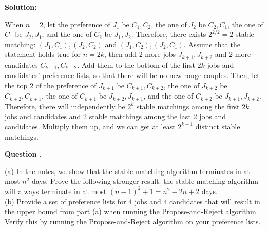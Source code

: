\documentclass[12pt]{article}
\newcounter{questionnumber}
\newenvironment{question}[1][]{\stepcounter{questionnumber}\par\noindent\textbf{Question \thequestionnumber. #1}\par}{\par}
\newenvironment{solution}{\par\noindent\textbf{Solution:}\par}{\par\vspace{1em}}
\begin{document}
\begin{solution}
    When $n=2$, let the preference of $J_1$ be $C_1, C_2$, the one of $J_2$ be $C_2, C_1$, the one of $C_1$ be $J_2, J_1$, and the one of $C_2$ be $J_1, J_2$.
    Therefore, there exists $2^{2/2}=2$ stable matching: $(J_1, C_1), (J_2, C_2)$ and $(J_1, C_2), (J_2, C_1)$.
    Assume that the statement holds true for $n=2k$, then add 2 more jobs $J_{k+1}, J_{k+2}$ and 2 more candidates $C_{k+1}, C_{k+2}$.
    Add them to the bottom of the first $2k$ jobs and candidates' preference lists, so that there will be no new rouge couples.
    Then, let the top 2 of the preference of $J_{k+1}$ be $C_{k+1}, C_{k+2}$, the one of $J_{k+2}$ be $C_{k+2}, C_{k+1}$, the one of $C_{k+1}$ be $J_{k+2}, J_{k+1}$, and the one of $C_{k+2}$ be $J_{k+1}, J_{k+2}$.
    Therefore, there will independently be $2^k$ stable matchings among the first $2k$ jobs and candidates and 2 stable matchings among the last 2 jobs and candidates.
    Multiply them up, and we can get at least $2^{k+1}$ distinct stable matchings.
\end{solution}
\begin{question}
    \noindent
    (a) In the notes, we show that the stable matching algorithm terminates in at most $n^2$ days. Prove the following stronger result: the stable matching algorithm will always terminate in at most $(n-1)^2 + 1 = n^2 - 2n + 2$ days.\\
    (b) Provide a set of preference lists for 4 jobs and 4 candidates that will result in the upper bound from part (a) when running the Propose-and-Reject algorithm. Verify this by running the Propose-and-Reject algorithm on your preference lists.
\end{question}
\end{document}
